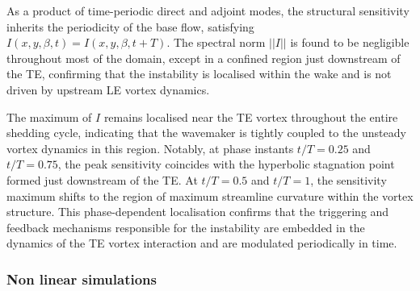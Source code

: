 As a product of time-periodic direct and adjoint modes, the structural sensitivity inherits the periodicity of the base flow, satisfying $I(x,y,\beta,t) = I (x,y,\beta,t+T)$. The spectral norm $||I||$ is found to be negligible throughout most of the domain, except in a confined region just downstream of the TE, confirming that the instability is localised within the wake and is not driven by upstream LE vortex dynamics.

The maximum of $I$ remains localised near the TE vortex throughout the entire shedding cycle, indicating that the wavemaker is tightly coupled to the unsteady vortex dynamics in this region. Notably, at phase instants $t/T=0.25$ and $t/T=0.75$, the peak sensitivity coincides with the hyperbolic stagnation point formed just downstream of the TE. At $t/T=0.5$ and $t/T=1$, the sensitivity maximum shifts to the region of maximum streamline curvature within the vortex structure. This phase-dependent localisation confirms that the triggering and feedback mechanisms responsible for the instability are embedded in the dynamics of the TE vortex interaction and are modulated periodically in time.

\subsubsection{Non linear simulations}


